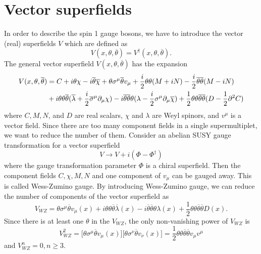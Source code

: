 \documentclass[12pt]{report}
\begin{document}
\section{Vector superfields}
In order to describe the spin 1 gauge bosons, we have to introduce the vector (real) superfields $V$ which are defined as
\begin{equation}
V(x, \theta, \overline{\theta}) = V^{\dag} (x, \theta, \overline{\theta}) .
\end{equation}
The general vector superfield $V(x, \theta, \overline{\theta})$ has the expansion
\begin{align}
V(x, \theta, \overline{\theta}) &= C + i \theta \chi - i \overline{\theta} \overline{\chi} + \theta \sigma^{\mu} \overline{\theta} v_{\mu} + \frac{i}{2} \theta \theta (M + iN) - \frac{i}{2} \overline{\theta} \overline{\theta} (M - iN) \notag \\
& + i \theta \theta \overline{\theta} (\overline{\lambda} + \frac{i}{2} \overline{\sigma}^{\mu} \partial_{\mu} \chi ) - i \overline{\theta} \overline{\theta} \theta (\lambda - \frac{i}{2} \sigma^{\mu} \partial_{\mu} \overline{\chi}) + \frac{1}{2} \theta \theta \overline{\theta} \overline{\theta} (D - \frac{1}{2} \partial^{2} C)
\end{align}
where $C, M, N$, and $D$ are real scalars, $\chi$ and $\lambda$ are Weyl spinors, and $v^{\mu}$ is a vector field.
Since there are too many component fields in a single supermultiplet, we want to reduce the number of them.
Consider an abelian SUSY gauge transformation for a vector superfield
\begin{equation}
V \to V + i (\Phi - \Phi^{\dag})
\end{equation}
where the gauge transformation parameter $\Phi$ is a chiral superfield. Then the component fields $C, \chi, M, N$ and one component of $v_{\mu}$ can be gauged away.
This is called Wess-Zumino gauge.
By introducing Wess-Zumino gauge, we can reduce the number of components of the vector superfield as
\begin{equation} \label{eq: WZ gauge vector superfield}
V_{WZ} = \theta \sigma^{\mu} \overline{\theta} v_{\mu}(x) + i \theta \theta \overline{\theta} \overline{\lambda}(x) - i \overline{\theta} \overline{\theta} \theta \lambda(x) + \frac{1}{2} \theta \theta \overline{\theta} \overline{\theta} D(x) .
\end{equation}
Since there is at least one $\theta$ in the $V_{WZ}$, the only non-vanishing power of $V_{WZ}$ is
\begin{equation}
V^{2}_{WZ} = \big[ \theta \sigma^{\mu} \overline{\theta} v_{\mu}(x) \big] \big[ \theta \sigma^{\nu} \overline{\theta} v_{\nu}(x) \big] = \frac{1}{2} \theta \theta \overline{\theta} \overline{\theta} v_{\mu} v^{\mu}
\end{equation}
and $V^{n}_{WZ} = 0, n \ge 3$.
\end{document}
